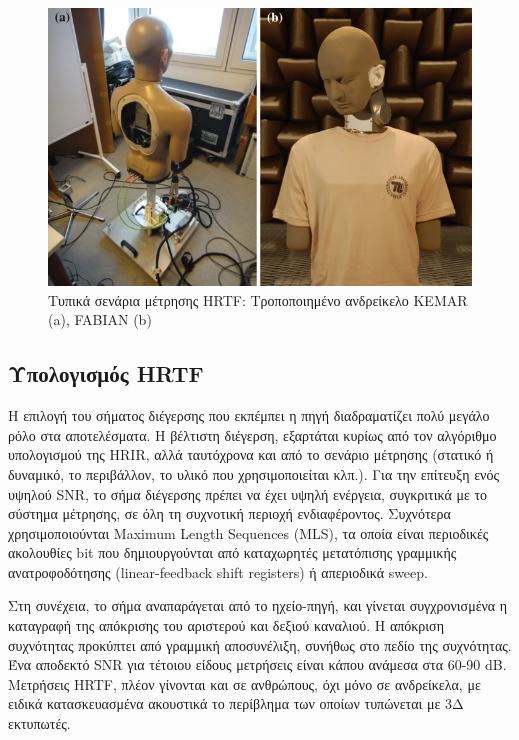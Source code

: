 \begin{figure}[h]
  \centering
  \includegraphics[width=\textwidth]{images/typical-HRTF-measurment-setup.png}
  \caption{Τυπικά σενάρια μέτρησης HRTF: Τροποποιημένο ανδρείκελο KEMAR (a), FABIAN (b)}
  \label{fig:typical-HRTF-measurment-setup}
\end{figure}

\subsection{Υπολογισμός HRTF}

Η επιλογή του σήματος διέγερσης που εκπέμπει η πηγή διαδραματίζει πολύ μεγάλο ρόλο στα αποτελέσματα. Η βέλτιστη διέγερση, εξαρτάται κυρίως από τον αλγόριθμο υπολογισμού της HRIR, αλλά ταυτόχρονα και από το σενάριο μέτρησης (στατικό ή δυναμικό, το περιβάλλον, το υλικό που χρησιμοποιείται κλπ.). Για την επίτευξη ενός υψηλού SNR, το σήμα διέγερσης πρέπει να έχει υψηλή ενέργεια, συγκριτικά με το σύστημα μέτρησης, σε όλη τη συχνοτική περιοχή ενδιαφέροντος. Συχνότερα χρησιμοποιούνται Maximum Length Sequences (MLS), τα οποία είναι περιοδικές ακολουθίες bit που δημιουργούνται από καταχωρητές μετατόπισης γραμμικής ανατροφοδότησης (linear-feedback shift registers) ή απεριοδικά sweep.

Στη συνέχεια, το σήμα αναπαράγεται από το ηχείο-πηγή, και γίνεται συγχρονισμένα η καταγραφή της απόκρισης του αριστερού και δεξιού καναλιού. Η απόκριση συχνότητας προκύπτει από γραμμική αποσυνέλιξη, συνήθως στο πεδίο της συχνότητας. Ένα αποδεκτό SNR για τέτοιου είδους μετρήσεις είναι κάπου ανάμεσα στα 60-90 dB. Μετρήσεις HRTF, πλέον γίνονται και σε ανθρώπους, όχι μόνο σε ανδρείκελα, με ειδικά κατασκευασμένα ακουστικά το περίβλημα των οποίων τυπώνεται με 3Δ εκτυπωτές. 

